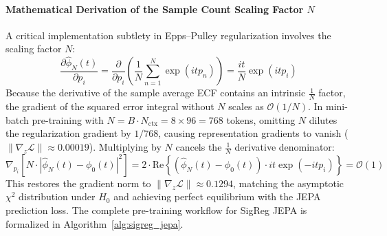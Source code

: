 \documentclass{article}
\begin{document}
\paragraph{Mathematical Derivation of the Sample Count Scaling Factor $N$}
A critical implementation subtlety in Epps--Pulley regularization involves the scaling factor $N$:
\begin{equation}
    \frac{\partial \hat{\phi}_N(t)}{\partial p_i} = \frac{\partial}{\partial p_i} \left( \frac{1}{N} \sum_{n=1}^N \exp(i t p_n) \right) = \frac{i t}{N} \exp(i t p_i)
\end{equation}
Because the derivative of the sample average ECF contains an intrinsic $\frac{1}{N}$ factor, the gradient of the squared error integral without $N$ scales as $\mathcal{O}(1/N)$. In mini-batch pre-training with $N = B \cdot N_{\text{ctx}} = 8 \times 96 = 768$ tokens, omitting $N$ dilutes the regularization gradient by $1/768$, causing representation gradients to vanish ($\|\nabla_z \mathcal{L}\| \approx 0.00019$). Multiplying by $N$ cancels the $\frac{1}{N}$ derivative denominator:
\begin{equation}
    \nabla_{p_i} \left[ N \cdot |\hat{\phi}_N(t) - \phi_0(t)|^2 \right] = 2 \cdot \text{Re}\left\{ (\hat{\phi}_N(t) - \phi_0(t)) \cdot i t \exp(-i t p_i) \right\} = \mathcal{O}(1)
\end{equation}
This restores the gradient norm to $\|\nabla_z \mathcal{L}\| \approx 0.1294$, matching the asymptotic $\chi^2$ distribution under $H_0$ and achieving perfect equilibrium with the JEPA prediction loss. The complete pre-training workflow for SigReg JEPA is formalized in Algorithm~\ref{alg:sigreg_jepa}.
\end{document}
